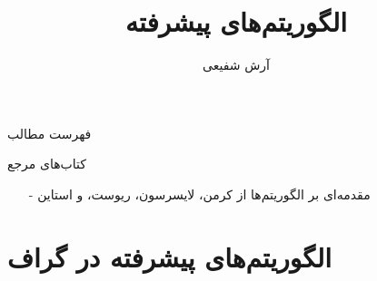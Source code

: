 \documentclass[aspectratio=169]{beamer}
\title{الگوریتم‌های پیشرفته}
\author{آرش شفیعی}
\institute{\texttt{[image: logos/ui.png]}}
\date{}
\begin{document}
\begin{frame}[plain]
	\maketitle
\end{frame}

\setcounter{framenumber}{0}
\raggedleft

\begin{frame}{فهرست مطالب}
\begin{flushright}
	\tableofcontents
\end{flushright}
\end{frame}

\begin{frame}{کتاب‌های مرجع}
	\begin{itemize}\itmsep{5mm}
		\item[-]
مقدمه‌ای بر الگوریتم‌ها از کرمن، لایسرسون، ریوست، و استاین
	\end{itemize}
\end{frame}

\section{الگوریتم‌های پیشرفته در گراف}



\end{document}
